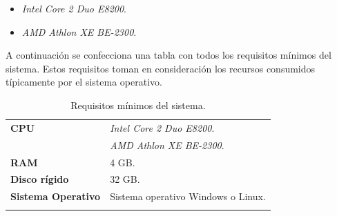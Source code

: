 \begin{itemize}
\item \textit{Intel Core 2 Duo E8200}.
\item \textit{AMD Athlon XE BE-2300}.
\end{itemize}

A continuación se confecciona una tabla con todos los requisitos mínimos del sistema. Estos requisitos toman en consideración los recursos consumidos típicamente por el sistema operativo.

\begin{longtable}{|l|l|}
    \hline
    \textbf{CPU} & \textit{Intel Core 2 Duo E8200}.\\
                 & \textit{AMD Athlon XE BE-2300}.\\
    \hline
    \textbf{RAM} & 4 GB.\\
    \hline
    \textbf{Disco rígido} & 32 GB.\\
    \hline
    \textbf{Sistema Operativo} & Sistema operativo Windows o Linux.\\
    \hline
    \caption{Requisitos mínimos del sistema.}\\
\end{longtable}

